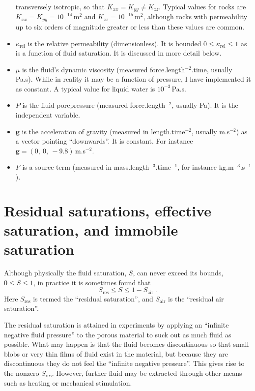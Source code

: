 \documentclass[]{scrreprt}
\begin{document}
\begin{itemize}
  transversely isotropic, so that $K_{xx}=K_{yy}\neq K_{zz}$.  Typical
  values for rocks are $K_{xx} = K_{yy} = 10^{-14}\,\mathrm{m}^{2}$
  and $K_{zz} = 10^{-15}\,\mathrm{m}^{2}$, although rocks with
  permeability up to six orders of magnitude greater or less than
  these values are common.
\item $\kappa_{\mathrm{rel}}$ is the relative permeability
  (dimensionless).  It is bounded $0\leq \kappa_{\mathrm{rel}} \leq 1$
  as is a function of fluid saturation.  It is discussed in more
  detail below.
\item $\mu$ is the fluid's dynamic viscosity (measured
  force.length$^{-2}$.time, usually Pa.s).  While in reality it may be
  a function of pressure, I have implemented it as constant.  A typical
  value for liquid water is $10^{-3}$\,Pa.s.
\item $P$ is the fluid porepressure (measured force.length$^{-2}$,
  usually Pa).  It is the independent variable.
\item ${\mathbf{g}}$ is the acceleration of gravity (measured
  in length.time$^{-2}$, usually m.s$^{-2}$) as a vector pointing ``downwards''.  It is constant.
  For instance
  ${\mathbf{g}} = (0,\ 0,\ -9.8)$\,m.s$^{-2}$.
\item $F$ is a source term (measured in
  mass.length$^{-3}$.time$^{-1}$, for instance kg.m$^{-3}$.s$^{-1}$).
\end{itemize}


\section{Residual saturations, effective saturation, and immobile saturation}

Although physically the fluid saturation, $S$, can never exceed its
bounds, $0\leq S\leq 1$, in practice it is sometimes found that
\begin{equation}
S_{\mathrm{res}} \leq S \leq 1 - S_{\mathrm{air}} \ .
\end{equation}
Here $S_{\mathrm{res}}$ is termed the ``residual saturation'', and
$S_{\mathrm{air}}$ is the ``residual air saturation''.

The residual saturation is attained in experiments by applying an
``infinite negative fluid pressure'' to the porous material to suck out as
much fluid as possible.  What may happen is that the fluid becomes
discontinuous so that small blobs or very thin films of fluid exist in
the material, but because they are discontinuous they do not feel
the ``infinite negative pressure''.  This gives rise to the nonzero
$S_{\mathrm{res}}$.  However, further fluid may be
extracted through other means such as heating or mechanical
stimulation.
\end{document}
